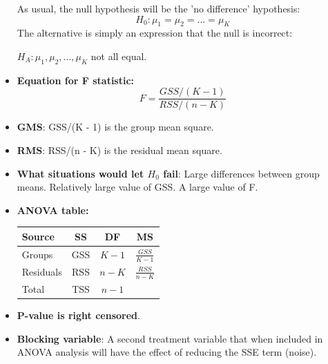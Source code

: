 \documentclass[12pt]{article}
\begin{document}
\begin{itemize}
As usual, the null hypothesis will be the 'no difference' hypothesis:
$$H_0: \mu_1=\mu_2=...=\mu_K$$
The alternative is simply an expression that the null is incorrect:

\centerline {$H_A:\mu_1, \mu_2, ..., \mu_K$ not all equal.}

\item \textbf{Equation for F statistic:}
$$F = \frac{GSS/(K-1)}{RSS/(n-K)}$$
\item \textbf{GMS}: GSS/(K - 1) is the group mean square.
\item \textbf{RMS}: RSS/(n - K) is the residual mean square.
\item \textbf{What situations would let $H_0$ fail}: Large differences between group means. Relatively large value of GSS. A large value of F.
\item \textbf{ANOVA table:}
\begin{table}[h]
\centering
\begin{tabular}{lccc}
\hline
Source & SS & DF & MS \\ \hline
Groups & GSS & $K - 1$ & $\frac{GSS}{K - 1}$ \\
Residuals & RSS & $n - K$ & $\frac{RSS}{n - K}$ \\ \hline
Total & TSS & $n - 1$ \\ \hline
\end{tabular}
\end{table}
\item \textbf{P-value is right censored}.
\item \textbf{Blocking variable}: A second treatment variable that when included in ANOVA analysis will have the effect of reducing the SSE term (noise).
\end{itemize}
\end{document}
